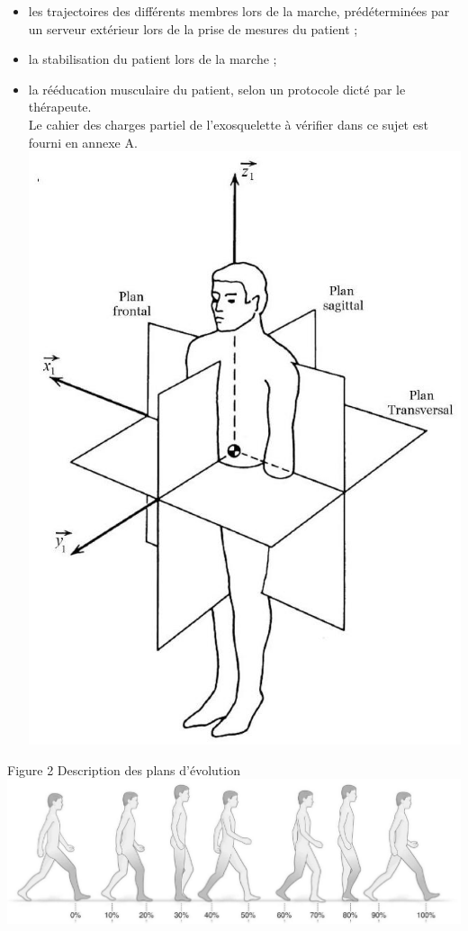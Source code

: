 \documentclass[10pt]{article}
\begin{document}
\begin{itemize}
  \item les trajectoires des différents membres lors de la marche, prédéterminées par un serveur extérieur lors de la prise de mesures du patient ;
  \item la stabilisation du patient lors de la marche ;
  \item la rééducation musculaire du patient, selon un protocole dicté par le thérapeute.\\
Le cahier des charges partiel de l'exosquelette à vérifier dans ce sujet est fourni en annexe A.\\
\includegraphics[max width=\textwidth, center]{2025_07_03_97545f5dc188959e5663g-02}
\end{itemize}

Figure 2 Description des plans d'évolution\\
\includegraphics[max width=\textwidth, center]{2025_07_03_97545f5dc188959e5663g-02(1)}
\end{document}
